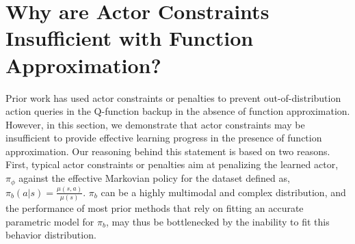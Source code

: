 \section{Why are Actor Constraints Insufficient with Function Approximation?}

Prior work has used actor constraints or penalties to prevent out-of-distribution action queries in the Q-function backup in the absence of function approximation. However, in this section, we demonstrate that actor constraints may be insufficient to provide effective learning progress in the presence of function approximation.
Our reasoning behind this statement is based on two reasons.
First, typical actor constraints or penalties aim at penalizing the learned actor, $\pi_\phi$ against
the effective Markovian policy for the dataset
defined as, $\pi_b(a|s) = \frac{\mu(s, a)}{\mu(s)}$. $\pi_b$ can be a highly multimodal and complex distribution, and the performance of most prior methods that rely on fitting an accurate parametric model for $\pi_b$, may thus be bottlenecked by the inability to fit this behavior distribution.

